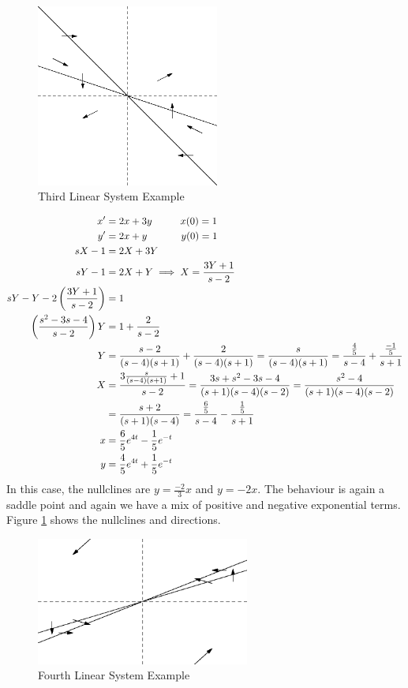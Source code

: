 \documentclass[fleqn,letterpaper]{report}
\begin{document}
\begin{figure}[t]
\centering
\includegraphics[width=6cm]{figure36.eps}
\caption{Third Linear System Example}
\label{figure-linear-system3}
\end{figure}

\begin{example}
\begin{align*}
x^\prime & = 2x + 3y \hspace{1cm} x(0) = 1 \\
y^\prime & = 2x + y \hspace{1.2cm} y(0) = 1\\
sX - 1 & = 2X + 3Y \\
sY - 1 & = 2X + Y \implies X = \frac{3Y+1}{s-2} \\
sY - Y - 2 \left( \frac{3Y+1}{s-2} \right) & = 1 \\
\left( \frac{s^2-3s-4}{s-2} \right) Y & = 1 + \frac{2}{s-2} \\
Y & = \frac{s-2}{(s-4)(s+1)} + \frac{2}{(s-4)(s+1)} =
\frac{s}{(s-4)(s+1)} = \frac{\frac{4}{5}}{s-4} +
\frac{\frac{-1}{5}}{s+1} \\
X & = \frac{3\frac{s}{(s-4)(s+1)} + 1}{s-2} =
\frac{3s+s^2-3s-4}{(s+1)(s-4)(s-2)} =
\frac{s^2-4}{(s+1)(s-4)(s-2)} \\
& = \frac{s+2}{(s+1)(s-4)} = \frac{\frac{6}{5}}{s-4} -
\frac{\frac{1}{5}}{s+1} \\
x & = \frac{6}{5} e^{4t} - \frac{1}{5} e^{-t} \\
y & = \frac{4}{5} e^{4t} + \frac{1}{5} e^{-t}
\end{align*}
In this case, the nullclines are $y = \frac{-2}{3}x$ and $y =
-2x$. The behaviour is again a saddle point and again we have
a mix of positive and negative exponential terms. Figure
\ref{figure-linear-system3} shows the nullclines and
directions.
\end{example}

\begin{figure}[t]
\centering
\includegraphics[width=7cm]{figure37.eps}
\caption{Fourth Linear System Example}
\label{figure-linear-system4}
\end{figure}
\end{document}
